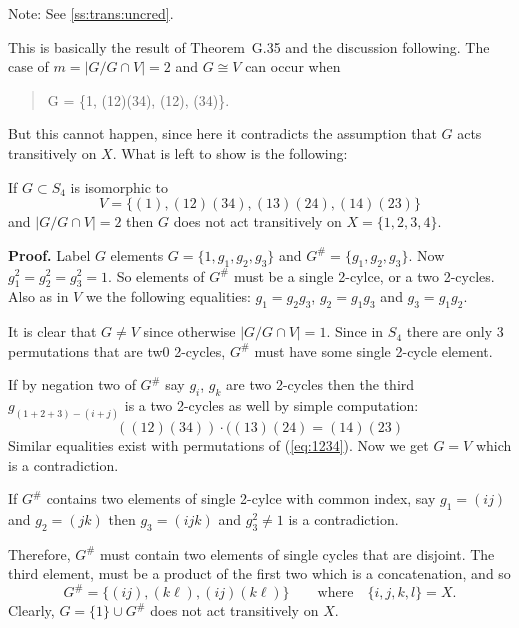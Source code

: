 \begin{myenumerate}
Note: See \ref{ss:trans:uncred}.

This is basically the result of Theorem~G.35 \cite{Rotman98}
and the discussion following.
The case of \(m = |G/G\cap V| = 2\) and \(G\cong V\)
can occur when
\begin{quotation}
G = \{1, (12)(34), (12), (34)\}.
\end{quotation}
But this cannot happen, since here it contradicts
the assumption that  $G$ acts transitively on $X$.
What is left to show is the following:

\begin{llem}
If \(G\subset S_4\) is isomorphic to
\begin{equation*}
 V = \{(1),(12)(34), (13)(24), (14)(23)\}
\end{equation*}
and \(|G/G\cap V| = 2\)
then $G$ does not act transitively on \(X=\{1,2,3,4\}\).
\end{llem}
\textbf{Proof.}
Label $G$ elements \(G=\{1,g_1,g_2,g_3\}\)
and \(G^{\#}=\{g_1,g_2,g_3\}\).
Now \(g_1^2 = g_2^2 = g_3^2 = 1\).
So elements of \(G^{\#}\)
must be a single 2-cylce, or
a two 2-cycles.
Also as in $V$ we the following equalities:
\(g_1 = g_2 g_3\),
\(g_2 = g_1 g_3\) and
\(g_3 = g_1 g_2\).

It is clear that \(G\neq V\) since otherwise  \(|G/G\cap V| = 1\).
Since in \(S_4\) there are only 3 permutations that are tw0 2-cycles,
\(G^{\#}\) must have some single 2-cycle element.

If by negation two of \(G^{\#}\) say \(g_i\), \(g_k\) are two 2-cycles
then the third \(g_{(1+2+3)-(i+j)}\) is a two 2-cycles as well
by simple computation:
\begin{equation}
((12)(34))\cdot((13)(24) = (14)(23)  \label{eq:1234}
\end{equation}
Similar equalities exist with permutations of (\ref{eq:1234}).
Now we get \(G=V\) which is a contradiction.

If \(G^{\#}\) contains two elements of single 2-cylce
with common index, say \(g_1 = (ij)\) and \(g_2 = (jk)\)
then \(g_3 = (ijk)\) and \(g_3^2 \neq 1\) is a contradiction.

Therefore, \(G^{\#}\) must contain two elements
of single cycles that are disjoint.
The third element, must be a product of the first two which is
a concatenation, and so
\begin{equation*}
G^{\#} = \{(ij), (k\ell), (ij)(k\ell)\}
  \qquad \textrm{where} \quad
 \{i,j,k,l\} = X.
\end{equation*}
Clearly, \(G = \{1\} \cup G^{\#}\) does not act transitively on $X$.
\proofend



\end{myenumerate}
